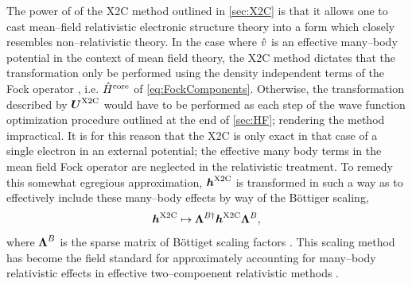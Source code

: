 The power of of the X2C method outlined in \cref{sec:X2C} is that it allows one
to cast mean--field relativistic electronic structure theory into a form which closely 
resembles non--relativistic theory. 
In the case where $\hat{v}$ is an effective many--body potential in the context of mean field theory, the X2C method
dictates that the transformation only be performed using the density independent terms of the Fock operator ,
i.e. $\hat{H}^\mathrm{core}$ of \cref{eq:FockComponents}. Otherwise, the transformation described by $\boldsymbol{U}^{\mathrm{X2C}}$ would
have to be performed as each step of the wave function optimization procedure outlined at the end  of \cref{sec:HF};
rendering the method impractical. It is for this reason that the X2C is only exact in that case of a single electron
in an external potential; the effective many body terms in the mean field Fock operator are neglected in the 
relativistic treatment. To remedy this somewhat egregious approximation, $\boldsymbol{h}^{\mathrm{X2C}}$ is transformed in such a
way as to effectively include these many--body effects by way of the B\"{o}ttiger  scaling,
\begin{equation}
\boldsymbol{h}^{\mathrm{X2C}} \mapsto \boldsymbol{\Lambda}^{B\dagger} \boldsymbol{h}^{\mathrm{X2C}} \boldsymbol{\Lambda}^{B},
\end{equation}
where $\boldsymbol{\Lambda}^B$ is the sparse matrix of B\"{o}ttiget scaling factors . 
This scaling method
has become the field standard for approximately accounting for many--body relativistic effects in effective
two--compoenent relativistic methods .

